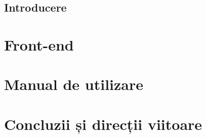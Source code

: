 \documentclass[12pt,a4paper]{report}
\begin{document}
\subsection{Introducere}

\section{Front-end}
\section{Manual de utilizare}
\section{Concluzii și direcții viitoare}

\renewcommand\bibname{Bibliografie}
\end{document}
